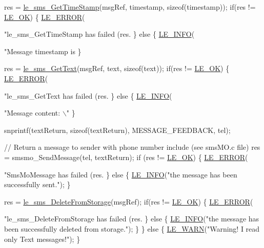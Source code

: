 \begin{DoxyCodeInclude}
{{{{        res = \hyperlink{le__sms__interface_8h_aca83e53998bd7105e14011af41ba6499}{le\_sms\_GetTimeStamp}(msgRef, timestamp, \textcolor{keyword}{sizeof}(timestamp));
        \textcolor{keywordflow}{if}(res != \hyperlink{le__basics_8h_a1cca095ed6ebab24b57a636382a6c86ca5066a4bcec691c6b67843b8f79656422}{LE\_OK})
        \{
            \hyperlink{le__log_8h_a353590f91b3143a7ba3a416ae5a50c3d}{LE\_ERROR}(\textcolor{stringliteral}{"le\_sms\_GetTimeStamp has failed (res.%
        \}
        \textcolor{keywordflow}{else}
        \{
            \hyperlink{le__log_8h_a23e6d206faa64f612045d688cdde5808}{LE\_INFO}(\textcolor{stringliteral}{"Message timestamp is %
        \}

        res = \hyperlink{le__sms__interface_8h_ac598dec158aed1e9fa134daf22c704db}{le\_sms\_GetText}(msgRef, text, \textcolor{keyword}{sizeof}(text));
        \textcolor{keywordflow}{if}(res != \hyperlink{le__basics_8h_a1cca095ed6ebab24b57a636382a6c86ca5066a4bcec691c6b67843b8f79656422}{LE\_OK})
        \{
            \hyperlink{le__log_8h_a353590f91b3143a7ba3a416ae5a50c3d}{LE\_ERROR}(\textcolor{stringliteral}{"le\_sms\_GetText has failed (res.%
        \}
        \textcolor{keywordflow}{else}
        \{
            \hyperlink{le__log_8h_a23e6d206faa64f612045d688cdde5808}{LE\_INFO}(\textcolor{stringliteral}{"Message content: \(\backslash\)"%
        \}

        snprintf(textReturn, \textcolor{keyword}{sizeof}(textReturn), MESSAGE\_FEEDBACK, tel);

        \textcolor{comment}{// Return a message to sender with phone number include (see smsMO.c file)}
        res = smsmo\_SendMessage(tel, textReturn);
        \textcolor{keywordflow}{if} (res != \hyperlink{le__basics_8h_a1cca095ed6ebab24b57a636382a6c86ca5066a4bcec691c6b67843b8f79656422}{LE\_OK})
        \{
            \hyperlink{le__log_8h_a353590f91b3143a7ba3a416ae5a50c3d}{LE\_ERROR}(\textcolor{stringliteral}{"SmsMoMessage has failed (res.%
        \}
        \textcolor{keywordflow}{else}
        \{
            \hyperlink{le__log_8h_a23e6d206faa64f612045d688cdde5808}{LE\_INFO}(\textcolor{stringliteral}{"the message has been successfully sent."});
        \}

        res = \hyperlink{le__sms__interface_8h_aff755186b683b94ba2788b48e28284a3}{le\_sms\_DeleteFromStorage}(msgRef);
        \textcolor{keywordflow}{if}(res != \hyperlink{le__basics_8h_a1cca095ed6ebab24b57a636382a6c86ca5066a4bcec691c6b67843b8f79656422}{LE\_OK})
        \{
            \hyperlink{le__log_8h_a353590f91b3143a7ba3a416ae5a50c3d}{LE\_ERROR}(\textcolor{stringliteral}{"le\_sms\_DeleteFromStorage has failed (res.%
        \}
        \textcolor{keywordflow}{else}
        \{
            \hyperlink{le__log_8h_a23e6d206faa64f612045d688cdde5808}{LE\_INFO}(\textcolor{stringliteral}{"the message has been successfully deleted from storage."});
        \}
    \}
    \textcolor{keywordflow}{else}
    \{
        \hyperlink{le__log_8h_a0201b2f60ee0e945479f91e181bf04b6}{LE\_WARN}(\textcolor{stringliteral}{"Warning! I read only Text messages!"});
    \}

}}}}}}}}}}
\end{DoxyCodeInclude}
